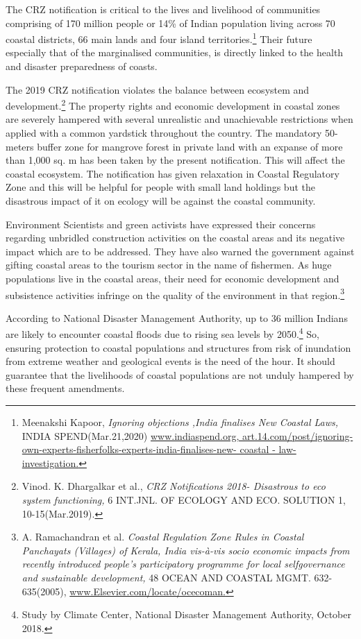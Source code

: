 \begin{multicols}{2}
\noi
The CRZ notification is critical to the lives and livelihood of communities comprising of
170 million people or 14\% of Indian population living across 70 coastal districts, 66 main 
lands and four island territories.\footnote{Meenakshi Kapoor, \textit{Ignoring objections ,India finalises New Coastal Laws,} INDIA SPEND(Mar.21,2020)
\url{www.indiaspend.org, art.14.com/post/ignoring-own-experts-fisherfolks-experts-india-finalises-new- coastal -
law-investigation.}} Their future especially that of the marginalised
communities, is directly linked to the health and disaster preparedness of coasts.

\noi
The 2019 CRZ notification violates the balance between ecosystem and development.\footnote{Vinod. K. Dhargalkar et al., \textit{CRZ Notifications 2018- Disastrous to eco system functioning,} 6 INT.JNL. OF
ECOLOGY AND ECO. SOLUTION 1, 10-15(Mar.2019).}
The property rights and economic development in coastal zones are severely hampered
with several unrealistic and unachievable restrictions when applied with a common
yardstick throughout the country. The mandatory 50-meters buffer zone for mangrove
forest in private land with an expanse of more than 1,000 sq. m has been taken by the
present notification. This will affect the coastal ecosystem. The notification has given
relaxation in Coastal Regulatory Zone and this will be helpful for people with small land
holdings but the disastrous impact of it on ecology will be against the coastal community.

\noi
Environment Scientists and green activists have expressed their concerns regarding
unbridled construction activities on the coastal areas and its negative impact which are to
be addressed. They have also warned the government against gifting coastal areas to the
tourism sector in the name of fishermen. As huge populations live in the coastal areas, their
need for economic development and subsistence activities infringe on the quality of the
environment in that region.\footnote{A. Ramachandran et al. \textit{Coastal Regulation Zone Rules in Coastal Panchayats (Villages) of Kerala, India vis-à-vis socio economic impacts from recently introduced people’s participatory programme for local selfgovernance and sustainable development,} 48 OCEAN AND COASTAL MGMT. 632- 635(2005), \url{www.Elsevier.com/locate/ocecoman.}}

\noi
According to National Disaster Management Authority, up to 36 million Indians are likely
to encounter coastal floods due to rising sea levels by 2050.\footnote{Study by Climate Center, National Disaster Management Authority, October 2018.} So, ensuring protection to
coastal populations and structures from risk of inundation from extreme weather and
geological events is the need of the hour. It should guarantee that the livelihoods of coastal
populations are not unduly hampered by these frequent amendments.


\end{multicols}

